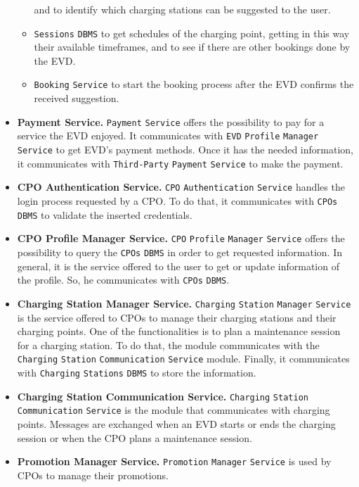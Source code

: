 \begin{itemize}
\begin{itemize}
        and to identify which charging stations can be suggested to the user.
        \item \verb|Sessions| \verb|DBMS| to get schedules of the charging point, getting in this way their available timeframes,
        and to see if there are other bookings done by the EVD\@.
        \item \verb|Booking| \verb|Service| to start the booking process after the EVD confirms the received suggestion.
    \end{itemize}
    \item \textbf{Payment Service.} \verb|Payment| \verb|Service| offers the possibility to pay for a service the EVD enjoyed.
    It communicates with \verb|EVD| \verb|Profile| \verb|Manager| \verb|Service| to get EVD's payment methods.
    Once it has the needed information, it communicates with \verb|Third-Party| \verb|Payment| \verb|Service| to make the payment.
    \item \textbf{CPO Authentication Service.} \verb|CPO| \verb|Authentication| \verb|Service| handles the login process requested by a CPO\@.
    To do that, it communicates with \verb|CPOs| \verb|DBMS| to validate the inserted credentials.
    \item \textbf{CPO Profile Manager Service.} \verb|CPO| \verb|Profile| \verb|Manager| \verb|Service| offers the possibility to query
    the \verb|CPOs| \verb|DBMS| in order to get requested information.
    In general, it is the service offered to the user to get or update information of the profile.
    So, he communicates with \verb|CPOs| \verb|DBMS|.
    \item \textbf{Charging Station Manager Service.} \verb|Charging| \verb|Station| \verb|Manager| \verb|Service| is the service offered to CPOs
    to manage their charging stations and their charging points.
    One of the functionalities is to plan a maintenance session for a charging station.
    To do that, the module communicates with the \verb|Charging| \verb|Station| \verb|Communication| \verb|Service| module.
    Finally, it communicates with \verb|Charging| \verb|Stations| \verb|DBMS| to store the information.
    \item \textbf{Charging Station Communication Service.} \verb|Charging| \verb|Station| \verb|Communication| \verb|Service| is the module
    that communicates with charging points.
    Messages are exchanged when an EVD starts or ends the charging session or when the CPO plans a maintenance session.
    \item \textbf{Promotion Manager Service.} \verb|Promotion| \verb|Manager| \verb|Service| is used by CPOs to manage their promotions.

\end{itemize}
